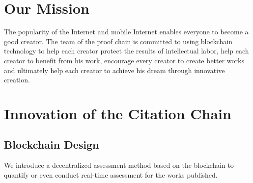 \documentclass[a4paper,oneside,openany]{tufte-book}
\begin{document}


\chapter{Our Mission}



\begin{quote}
\textsf{}
\end{quote}


The popularity of the Internet and mobile Internet enables everyone to become a good creator. The team of the proof chain is committed to using blockchain technology to help each creator protect the results of intellectual labor, help each creator to benefit from his work, encourage every creator to create better works and ultimately help each creator to achieve his dream through innovative creation.





































\chapter{Innovation of the Citation Chain}



\section{Blockchain Design}

We introduce a decentralized assessment method based on the blockchain to quantify or even conduct real-time assessment for the works published.
\end{document}
